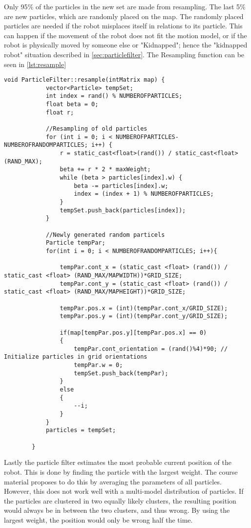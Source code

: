 \documentclass[Main]{subfiles}
\begin{document}
	Only 95$\%$ of the particles in the new set are made from resampling.
	The last 5$\%$ are new particles, which are randomly placed on the map.
	The randomly placed particles are needed if the robot misplaces itself in relations to its particle.
	This can happen if the movement of the robot does not fit the motion model, or if the robot is physically moved by someone else or "Kidnapped"; hence the "kidnapped robot" situation described in \autoref{sec:particlefilter}. 
	The Resampling function can be seen in \autoref{lst:resample}
	\vspace{12pt}
	\begin{lstlisting}[caption=Resampling function of ParticleFilter, style=Code-C++, label=lst:resample, basicstyle=\scriptsize]
		void ParticleFilter::resample(intMatrix map) {
			vector<Particle> tempSet;
			int index = rand() % NUMBEROFPARTICLES;
			float beta = 0;
			float r;
		
			//Resampling of old particles
			for (int i = 0; i < NUMBEROFPARTICLES-NUMBEROFRANDOMPARTICLES; i++) {
				r = static_cast<float>(rand()) / static_cast<float>(RAND_MAX);
				beta += r * 2 * maxWeight;
				while (beta > particles[index].w) {
					beta -= particles[index].w;
					index = (index + 1) % NUMBEROFPARTICLES;
				}
				tempSet.push_back(particles[index]);
			}
		
			//Newly generated random particels
			Particle tempPar;
			for(int i = 0; i < NUMBEROFRANDOMPARTICLES; i++){
		
				tempPar.cont_x = (static_cast <float> (rand()) / static_cast <float> (RAND_MAX/MAPWIDTH))*GRID_SIZE;
				tempPar.cont_y = (static_cast <float> (rand()) / static_cast <float> (RAND_MAX/MAPHEIGHT))*GRID_SIZE;
	
				tempPar.pos.x = (int)(tempPar.cont_x/GRID_SIZE);
				tempPar.pos.y = (int)(tempPar.cont_y/GRID_SIZE);
		
				if(map[tempPar.pos.y][tempPar.pos.x] == 0)
				{
					tempPar.cont_orientation = (rand()%4)*90; // Initialize particles in grid orientations
					tempPar.w = 0;
					tempSet.push_back(tempPar);
				}
				else
				{
					--i;
				}
			}
			particles = tempSet;
	
		}	
	\end{lstlisting}

	Lastly the particle filter estimates the most probable current position of the robot. 
	This is done by finding the particle with the largest weight.
	The course material proposes to do this by averaging the parameters of all particles.
	However, this does not work well with a multi-model distribution of particles.
	If the particles are clustered in two equally likely clusters, the resulting position would always be in between the two clusters, and thus wrong.
	By using the largest weight, the position would only be wrong half the time.
	
\end{document}
